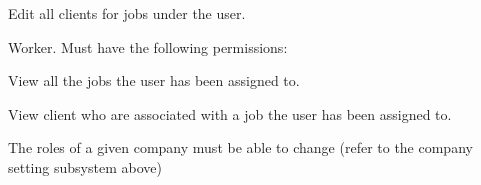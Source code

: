 \documentclass{article}
\begin{document}
\begin{list}{R.}{}
\begin{list}{R.}{}
\begin{list}{R..}{}
				\item Edit all clients for jobs under the user.
			\end{list}
			\item Worker. Must have the following permissions:
			\begin{list}{R..}{}
				\item View all the jobs the user has been assigned to.
				\item View client who are associated with a job the user has been assigned to.
			\end{list}
		\end{list} 
		\item The roles of a given company must be able to change (refer to the company setting subsystem above)
	\end{list}
	
\end{document}
